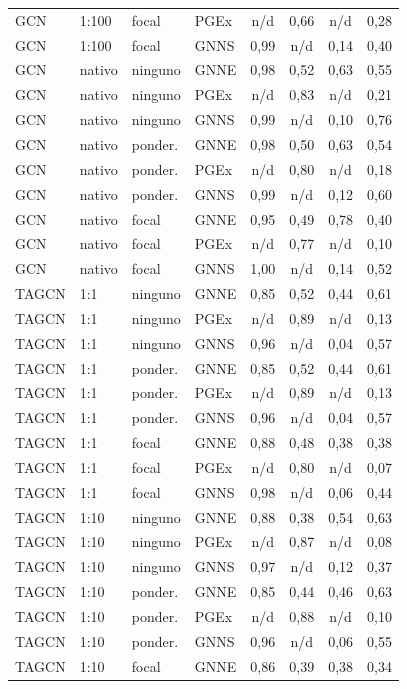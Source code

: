 \begin{longtable}{llll cccc}
GCN & 1:100 & focal & PGEx & n/d & 0,66 & n/d & 0,28 \\
GCN & 1:100 & focal & GNNS & 0,99 & n/d & 0,14 & 0,40 \\
GCN & nativo & ninguno & GNNE & 0,98 & 0,52 & 0,63 & 0,55 \\
GCN & nativo & ninguno & PGEx & n/d & 0,83 & n/d & 0,21 \\
GCN & nativo & ninguno & GNNS & 0,99 & n/d & 0,10 & 0,76 \\
GCN & nativo & ponder. & GNNE & 0,98 & 0,50 & 0,63 & 0,54 \\
GCN & nativo & ponder. & PGEx & n/d & 0,80 & n/d & 0,18 \\
GCN & nativo & ponder. & GNNS & 0,99 & n/d & 0,12 & 0,60 \\
GCN & nativo & focal & GNNE & 0,95 & 0,49 & 0,78 & 0,40 \\
GCN & nativo & focal & PGEx & n/d & 0,77 & n/d & 0,10 \\
GCN & nativo & focal & GNNS & 1,00 & n/d & 0,14 & 0,52 \\
TAGCN & 1:1 & ninguno & GNNE & 0,85 & 0,52 & 0,44 & 0,61 \\
TAGCN & 1:1 & ninguno & PGEx & n/d & 0,89 & n/d & 0,13 \\
TAGCN & 1:1 & ninguno & GNNS & 0,96 & n/d & 0,04 & 0,57 \\
TAGCN & 1:1 & ponder. & GNNE & 0,85 & 0,52 & 0,44 & 0,61 \\
TAGCN & 1:1 & ponder. & PGEx & n/d & 0,89 & n/d & 0,13 \\
TAGCN & 1:1 & ponder. & GNNS & 0,96 & n/d & 0,04 & 0,57 \\
TAGCN & 1:1 & focal & GNNE & 0,88 & 0,48 & 0,38 & 0,38 \\
TAGCN & 1:1 & focal & PGEx & n/d & 0,80 & n/d & 0,07 \\
TAGCN & 1:1 & focal & GNNS & 0,98 & n/d & 0,06 & 0,44 \\
TAGCN & 1:10 & ninguno & GNNE & 0,88 & 0,38 & 0,54 & 0,63 \\
TAGCN & 1:10 & ninguno & PGEx & n/d & 0,87 & n/d & 0,08 \\
TAGCN & 1:10 & ninguno & GNNS & 0,97 & n/d & 0,12 & 0,37 \\
TAGCN & 1:10 & ponder. & GNNE & 0,85 & 0,44 & 0,46 & 0,63 \\
TAGCN & 1:10 & ponder. & PGEx & n/d & 0,88 & n/d & 0,10 \\
TAGCN & 1:10 & ponder. & GNNS & 0,96 & n/d & 0,06 & 0,55 \\
TAGCN & 1:10 & focal & GNNE & 0,86 & 0,39 & 0,38 & 0,34 \\

\end{longtable}
